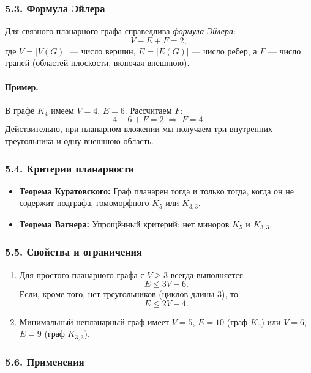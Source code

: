 \subsubsection{5.3. Формула Эйлера}

Для связного планарного графа справедлива \emph{формула Эйлера}:
\[
  V - E + F = 2,
\]
где $V = |V(G)|$ — число вершин, $E = |E(G)|$ — число ребер, а $F$ — число граней (областей плоскости, включая внешнюю).

\paragraph{Пример.} В графе $K_4$ имеем $V=4$, $E=6$. Рассчитаем $F$:
\[
  4 - 6 + F = 2 \;\Longrightarrow\; F = 4.
\]
Действительно, при планарном вложении мы получаем три внутренних треугольника и одну внешнюю область.

\subsubsection{5.4. Критерии планарности}

\begin{itemize}[leftmargin=*]
  \item \textbf{Теорема Куратовского:} Граф планарен тогда и только тогда, когда он не содержит подграфа, гомоморфного $K_5$ или $K_{3,3}$.
  \item \textbf{Теорема Вагнера:} Упрощённый критерий: нет миноров $K_5$ и $K_{3,3}$.
\end{itemize}

\subsubsection{5.5. Свойства и ограничения}

\begin{enumerate}[label=\arabic*)]
  \item Для простого планарного графа с $V\ge3$ всегда выполняется
  \[
    E \le 3V - 6.
  \]
  Если, кроме того, нет треугольников (циклов длины 3), то
  \[
    E \le 2V - 4.
  \]
  \item Минимальный непланарный граф имеет $V=5$, $E=10$ (граф $K_5$) или $V=6$, $E=9$ (граф $K_{3,3}$).
\end{enumerate}

\subsubsection{5.6. Применения}

